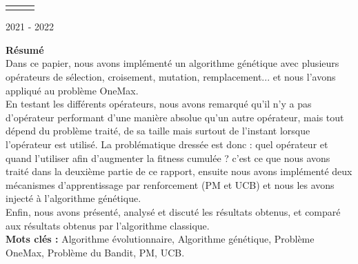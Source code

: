 \documentclass[12pt]{article}
\begin{document}
\begin{table}[H]
\begin{tabular}{lll}
&&\\
\end{tabular}
\end{table}

\begin{center}
2021 - 2022
\end{center}


\newpage
\renewcommand\headrulewidth{1 pt}\fancyhead[L]{}\fancyhead[C]{} 
\thispagestyle{empty}
\tableofcontents

\newpage
\renewcommand\headrulewidth{1 pt}\fancyhead[L]{}\fancyhead[C]{}

\thispagestyle{empty}
\textbf{Résumé}\\

Dans ce papier, nous avons implémenté un algorithme génétique avec plusieurs opérateurs de sélection, croisement, mutation, remplacement... et nous l'avons appliqué au problème OneMax.\\

En testant les différents opérateurs, nous avons remarqué qu'il n'y a pas d'opérateur performant d'une manière absolue qu'un autre opérateur, mais tout dépend du problème traité, de sa taille mais surtout de l'instant lorsque l'opérateur est utilisé. La problématique dressée est donc : quel opérateur et quand l'utiliser afin d'augmenter la fitness cumulée ? c'est ce que nous avons traité dans la deuxième partie de ce rapport, ensuite nous avons implémenté deux mécanismes d'apprentissage par renforcement (PM et UCB) et nous les avons injecté à l'algorithme génétique.\\

Enfin, nous avons présenté, analysé et discuté les résultats obtenus, et comparé aux résultats obtenus par l'algorithme classique.\\ 

\textbf{Mots clés : } Algorithme évolutionnaire, Algorithme génétique, Problème OneMax, Problème du Bandit, PM, UCB.

\newpage
\renewcommand\headrulewidth{1 pt}\fancyhead[L]{}\fancyhead[C]{} 
\setcounter{page}{1}
\end{document}
